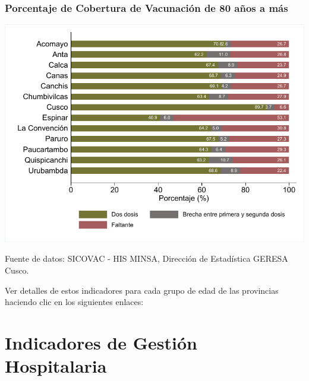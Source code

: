 \documentclass[xcolor=table]{beamer}
\begin{document}
\begin{frame}[label=cobertura_vacuna_provincias]
	\frametitle{Porcentaje de Cobertura de Vacunación de 80 años a más}
	\vspace{-.5cm}
	\begin{center}
		\includegraphics[width=0.8\linewidth, trim={.2cm .5cm .2cm .2cm},clip]{../figuras/vacunacion_provincial_edad_8.pdf}
	\end{center}
	{\tiny Fuente de datos: SICOVAC - HIS MINSA, Dirección de Estadística GERESA Cusco.} \hyperlink{indice}{}
	
	Ver detalles de estos indicadores para cada grupo de edad de las provincias haciendo clic en los siguientes enlaces:
	\hyperlink{vacunas_70}{}
	\hyperlink{vacunas_60}{} \hyperlink{vacunas_50}{} \hyperlink{vacunas_40}{} \hyperlink{vacunas_30}{}
	\hyperlink{vacunas_20}{} \hyperlink{vacunas_10}{}
	
\end{frame}



	\section{Indicadores de Gestión Hospitalaria}
	
\end{document}
